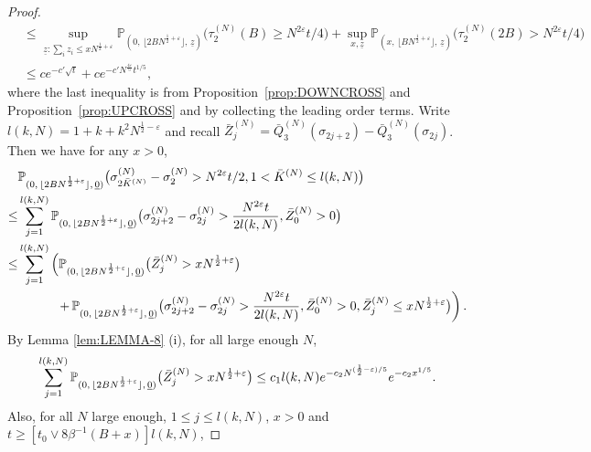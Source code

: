 \documentclass[11pt, reqno]{article}
\numberwithin{equation}{section}
\numberwithin{theorem}{section}
\begin{document}
\begin{proof}
\begin{align}
    & \leq \sup_{\underline{z}: \sum_iz_i \leq xN^{\frac{1}{2}+\varepsilon}}\mathbb{P}_{(0, \, \lfloor 2BN^{\frac{1}{2}+\varepsilon} \rfloor, \,\underline{z})}\big(\tau^{(N)}_2(B)\geq N^{2\varepsilon}t/4\big)
    +  \sup_{x,\underline{z}}\mathbb{P}_{(x, \, \lfloor BN^{\frac{1}{2}+\varepsilon} \rfloor, \,\underline{z})}\big(\tau^{(N)}_2(2B)>N^{2\varepsilon}t/4\big)\nonumber\\
    &\leq  ce^{-c'\sqrt{t}}+c e^{-c'N^{\frac{4\varepsilon}{5}}t^{1/5}},\nonumber
\end{align}
where the last inequality is from Proposition~\ref{prop:DOWNCROSS} and Proposition~\ref{prop:UPCROSS} and by collecting the leading order terms.
Write $l(k,N)=1+k+k^2N^{\frac{1}{2}-\varepsilon}$ and
recall $\bar{Z}^{(N)}_{j}=\bar{Q}^{(N)}_3(\sigma_{2j+2})-\bar{Q}^{(N)}_3(\sigma_{2j})$.
Then we have for any $x>0$,
\begin{equation}\label{eq:5.3-local-0}
    \begin{split}
     &\mathbb{P}_{(0, \, \lfloor 2BN^{\frac{1}{2}+\varepsilon} \rfloor, \,\underline{0})}\big(\sigma^{(N)}_{2\bar{K}^{(N)}}-\sigma^{(N)}_2>N^{2\varepsilon}t/2,1<\bar{K}^{(N)}\leq l(k,N)\big)\\
    \leq&\sum_{j=1}^{l(k,N)}\mathbb{P}_{(0, \, \lfloor 2BN^{\frac{1}{2}+\varepsilon} \rfloor, \,\underline{0})}\big(\sigma^{(N)}_{2j+2}-\sigma^{(N)}_{2j}>\frac{N^{2\varepsilon}t}{2l(k,N)},\Bar{Z}^{(N)}_0>0\big)\\
    \leq& \sum_{j=1}^{l(k,N)}\left(\mathbb{P}_{(0, \, \lfloor 2BN^{\frac{1}{2}+\varepsilon} \rfloor, \,\underline{0})}\big(\Bar{Z}^{(N)}_j>xN^{\frac{1}{2}+\varepsilon}\big)\right.\\
 &\qquad\quad \left. + \, \mathbb{P}_{(0, \, \lfloor 2BN^{\frac{1}{2}+\varepsilon} \rfloor, \,\underline{0})}\big(\sigma^{(N)}_{2j+2}-\sigma^{(N)}_{2j}>\frac{N^{2\varepsilon}t}{2l(k,N)},\Bar{Z}^{(N)}_0>0,\Bar{Z}^{(N)}_j\leq xN^{\frac{1}{2}+\varepsilon}\big)\right).
    \end{split}
\end{equation}
By Lemma \ref{lem:LEMMA-8} (i), for all large enough $N$,
\begin{equation}\label{eq:5.3-local-1}
    \sum_{j=1}^{l(k,N)}\mathbb{P}_{(0, \, \lfloor 2BN^{\frac{1}{2}+\varepsilon} \rfloor, \,\underline{0})}\big(\Bar{Z}^{(N)}_j>xN^{\frac{1}{2}+\varepsilon}\big)\leq c_1l(k,N)e^{-c_2N^{(\frac{1}{2}-\varepsilon)/5}}e^{-c_2x^{1/5}}.
\end{equation}
Also, for all $N$ large enough, $1\leq j\leq l(k,N)$, $x > 0$ and $t\geq [t_0 \vee 8\beta^{-1}(B+ x)] l(k,N)$,

\end{proof}
\end{document}
